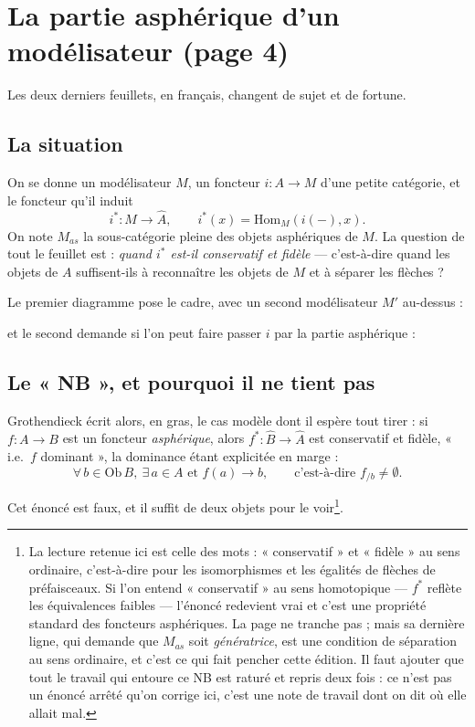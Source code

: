 \documentclass[11pt,a4paper]{article}
\begin{document}
\section*{La partie asphérique d'un modélisateur (page 4)}

Les deux derniers feuillets, en français, changent de sujet et de fortune.

\subsection*{La situation}

On se donne un modélisateur $M$, un foncteur $i : A \to M$ d'une petite
catégorie, et le foncteur qu'il induit
\[
i^{*} : M \longrightarrow \hat{A}, \qquad
i^{*}(x) = \mathrm{Hom}_{M}(i(-), x).
\]
On note $M_{as}$ la sous-catégorie pleine des objets asphériques de $M$. La
question de tout le feuillet est : \emph{quand $i^{*}$ est-il conservatif et
fidèle} — c'est-à-dire quand les objets de $A$ suffisent-ils à reconnaître les
objets de $M$ et à séparer les flèches ?

Le premier diagramme pose le cadre, avec un second modélisateur $M'$ au-dessus :


et le second demande si l'on peut faire passer $i$ par la partie asphérique :


\subsection*{Le « NB », et pourquoi il ne tient pas}

Grothendieck écrit alors, en gras, le cas modèle dont il espère tout tirer : si
$f : A \to B$ est un foncteur \emph{asphérique}, alors
$f^{*} : \hat{B} \to \hat{A}$ est conservatif et fidèle, « i.e.\ $f$ dominant »,
la dominance étant explicitée en marge :
\[
\forall\, b \in \mathrm{Ob}\,B,\ \exists\, a \in A \text{ et } f(a) \to b,
\qquad \text{c'est-à-dire } f_{/b} \neq \emptyset.
\]

Cet énoncé est faux, et il suffit de deux objets pour le voir\footnote{La lecture
retenue ici est celle des mots : « conservatif » et « fidèle » au sens ordinaire,
c'est-à-dire pour les isomorphismes et les égalités de flèches de préfaisceaux.
Si l'on entend « conservatif » au sens homotopique — $f^{*}$ reflète les
équivalences faibles — l'énoncé redevient vrai et c'est une propriété standard
des foncteurs asphériques. La page ne tranche pas ; mais sa dernière ligne, qui
demande que $M_{as}$ soit \emph{génératrice}, est une condition de séparation au
sens ordinaire, et c'est ce qui fait pencher cette édition. Il faut ajouter que
tout le travail qui entoure ce NB est raturé et repris deux fois : ce n'est pas
un énoncé arrêté qu'on corrige ici, c'est une note de travail dont on dit où elle
allait mal.}.
\end{document}

